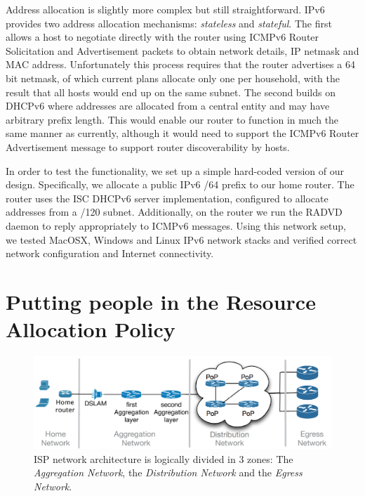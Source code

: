 Address allocation is slightly more complex but still straightforward.  IPv6
provides two address allocation mechanisms: \emph{stateless} and
\emph{stateful}.  The first allows a host to negotiate directly with the router
using ICMPv6 Router Solicitation and Advertisement packets to obtain network
details, IP netmask and MAC address.  Unfortunately this process requires that
the router advertises a 64 bit netmask, of which current plans allocate only one
per household, with the result that all hosts would end up on the same subnet.
The second builds on DHCPv6 where addresses are allocated from a central entity
and may have arbitrary prefix length.  This would enable our router to function
in much the same manner as currently, although it would need to support the
ICMPv6 Router Advertisement message to support router discoverability by hosts. 

In order to test the functionality, we set up a simple hard-coded version of our
design. Specifically, we allocate a public IPv6 /64 prefix to our home router.
The router uses the ISC DHCPv6 server implementation, configured to allocate
addresses from a /120 subnet.  Additionally, on the router we run the RADVD
daemon to reply appropriately to ICMPv6 messages.  Using this network setup, we
tested MacOSX, Windows and Linux IPv6 network stacks and verified correct network
configuration and Internet connectivity. 


\section{Putting people in the Resource Allocation Policy}\label{s:qos}

\begin{figure}
  \centering
  \includegraphics[width=0.95\columnwidth]{isp_plan}
  \caption[ISP network architecture]{\label{fig:isp_plan} ISP network architecture is logically divided in 3
    zones: The {\it Aggregation Network}, the {\it Distribution Network}\/ and
    the {\it Egress Network}.}
\end{figure}

